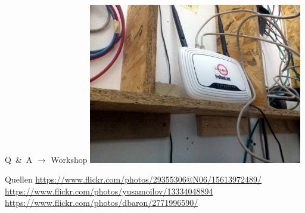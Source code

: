\documentclass[10pt]{beamer}
\begin{document}
\begin{frame}{Q~\&~A $\rightarrow$ Workshop}
\vfill
\centering
\includegraphics[width=0.7\textwidth]{images/irl_router}
\vfill
\end{frame}

\begin{frame}{Quellen}
\url{https://www.flickr.com/photos/29355306@N06/15613972489/}\\
\url{https://www.flickr.com/photos/yusamoilov/13334048894}\\
\url{https://www.flickr.com/photos/dbaron/2771996590/}
\end{frame}
\end{document}
